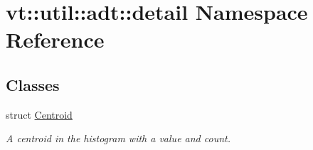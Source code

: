 \hypertarget{namespacevt_1_1util_1_1adt_1_1detail}{}\section{vt\+:\+:util\+:\+:adt\+:\+:detail Namespace Reference}
\label{namespacevt_1_1util_1_1adt_1_1detail}
\subsection*{Classes}
\begin{DoxyCompactItemize}
\item 
struct \hyperlink{structvt_1_1util_1_1adt_1_1detail_1_1_centroid}{Centroid}
\begin{DoxyCompactList}\small\item\em A centroid in the histogram with a value and count. \end{DoxyCompactList}\end{DoxyCompactItemize}
